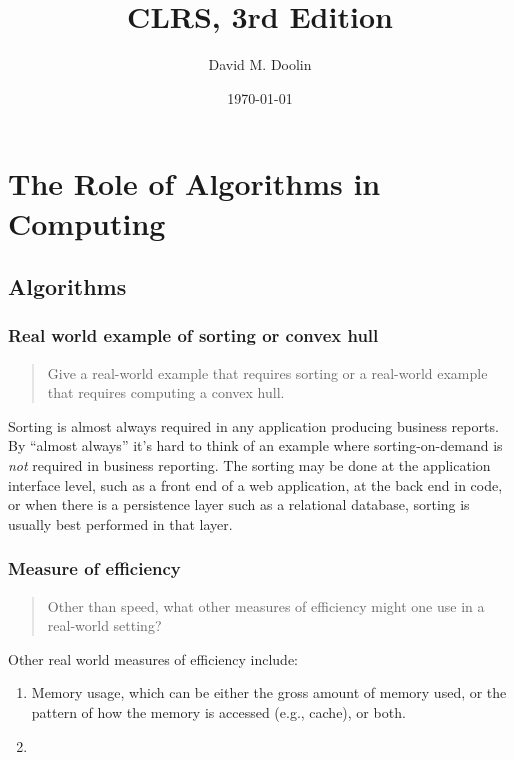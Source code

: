 \documentclass{article}
\title{CLRS, 3rd Edition}
\date{\today}
\author{David M. Doolin}
\begin{document}
\maketitle


\tableofcontents

\section{The Role of Algorithms in Computing}

\subsection{Algorithms}

\subsubsection{Real world example of sorting or convex hull}

\begin{quote}
  Give a real-world example that requires sorting or a real-world
  example that requires computing a convex hull.
\end{quote}

Sorting is almost always required in any application producing business
reports. By ``almost always'' it's hard to think of an example where
sorting-on-demand is \emph{not} required in business reporting. The sorting
may be done at the application interface level, such as a front end of
a web application, at the back end in code, or when there is a persistence
layer such as a relational database, sorting is usually best performed
in that layer.

\subsubsection{Measure of efficiency}

\begin{quote}
  Other than speed, what other measures of efficiency might one use in a
  real-world setting?
\end{quote}

Other real world measures of efficiency include:

\begin{enumerate}
  \item Memory usage, which can be either the gross amount of memory used, or the pattern
    of how the memory is accessed (e.g., cache), or both.
  \item
\end{enumerate}
\end{document}
